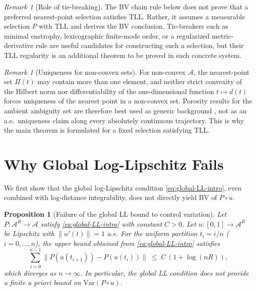 \documentclass[12pt,a4paper]{article}
\theoremstyle{definition}
\theoremstyle{plain}
\newtheorem{proposition}[definition]{Proposition}
\theoremstyle{remark}
\newtheorem{remark}[definition]{Remark}
\newcommand{\Var}{\mathrm{Var}}
\begin{document}
\begin{remark}[Role of tie-breaking]
The BV chain rule below does not prove that a preferred nearest-point
selection satisfies TLL.  Rather, it assumes a measurable selection
$P$ with TLL and derives the BV conclusion.  Tie-breakers such as
minimal enstrophy, lexicographic finite-mode order, or a regularized
metric-derivative rule are useful candidates for constructing such a
selection, but their TLL regularity is an additional theorem to be
proved in each concrete system.
\end{remark}

\begin{remark}[Uniqueness for non-convex sets]\label{rem:uniqueness-caveat}
For non-convex $\mathcal{A}$, the nearest-point set $\Pi(t)$
may contain more than one element, and neither strict convexity of
the Hilbert norm nor differentiability of the one-dimensional
function $t\mapsto d(t)$ forces uniqueness of the nearest point in a
non-convex set.  Porosity results for the ambient ambiguity set are
therefore best used as generic background
\cite{Zamfirescu1990,DeBlasiMyjak1993}, not as an a.e.\ uniqueness
claim along every absolutely continuous trajectory.  This is why the
main theorem is formulated for a fixed selection satisfying TLL.
\end{remark}


\section{Why Global Log-Lipschitz Fails}
\label{sec:counterexample}

We first show that the global log-Lipschitz condition
\eqref{eq:global-LL-intro}, even combined with log-distance
integrability, does not directly yield BV of $P \circ u$.

\begin{proposition}[Failure of the global LL bound to control variation]
\label{prop:divergence}
Let $P: \mathcal{A}^R \to \mathcal{A}$ satisfy
\eqref{eq:global-LL-intro} with constant $C > 0$.  Let
$u: [0,1] \to \mathcal{A}^R$ be Lipschitz with
$\|u'(t)\| = 1$ a.e.  For the uniform partition
$t_i = i/n$ ($i = 0, \ldots, n$), the upper bound obtained
from \eqref{eq:global-LL-intro} satisfies
\[
  \sum_{i=0}^{n-1} \|P(u(t_{i+1})) - P(u(t_i))\|
  \;\le\;
  C\,(1 + \log(nR)),
\]
which diverges as $n \to \infty$.  In particular, the global LL
condition does not provide a finite \emph{a priori} bound on
$\Var(P \circ u)$.
\end{proposition}
\end{document}
